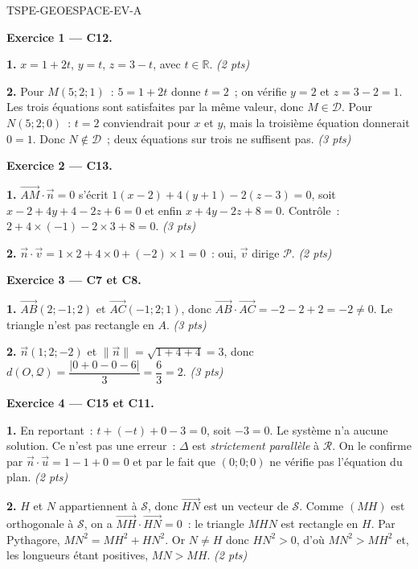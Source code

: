 
\begin{corrige}{TSPE-GEOESPACE-EV-A}

\textbf{Exercice 1 — C12.}

\textbf{1.} $x=1+2t$, $y=t$, $z=3-t$, avec $t\in\mathbb{R}$. \hfill\textit{(2 pts)}

\textbf{2.} Pour $M(5;2;1)$~: $5=1+2t$ donne $t=2$~; on vérifie $y=2$ et
$z=3-2=1$. Les trois équations sont satisfaites par la même valeur, donc
$M\in\mathcal{D}$.
Pour $N(5;2;0)$~: $t=2$ conviendrait pour $x$ et $y$, mais la troisième
équation donnerait $0=1$. Donc $N\notin\mathcal{D}$~; deux équations sur trois
ne suffisent pas. \hfill\textit{(3 pts)}

\medskip
\textbf{Exercice 2 — C13.}

\textbf{1.} $\vec{AM}\cdot\vec{n}=0$ s'écrit $1(x-2)+4(y+1)-2(z-3)=0$, soit
$x-2+4y+4-2z+6=0$ et enfin $x+4y-2z+8=0$. Contrôle~:
$2+4\times(-1)-2\times3+8=0$. \hfill\textit{(3 pts)}

\textbf{2.} $\vec{n}\cdot\vec{v}=1\times2+4\times0+(-2)\times1=0$~: oui,
$\vec{v}$ dirige $\mathcal{P}$. \hfill\textit{(2 pts)}

\medskip
\textbf{Exercice 3 — C7 et C8.}

\textbf{1.} $\vec{AB}(2;-1;2)$ et $\vec{AC}(-1;2;1)$, donc
$\vec{AB}\cdot\vec{AC}=-2-2+2=-2\neq0$. Le triangle n'est pas rectangle en
$A$. \hfill\textit{(3 pts)}

\textbf{2.} $\vec{n}(1;2;-2)$ et $\lVert\vec{n}\rVert=\sqrt{1+4+4}=3$, donc
$d(O,\mathcal{Q})=\dfrac{\lvert 0+0-0-6\rvert}{3}=\dfrac{6}{3}=2$.
\hfill\textit{(3 pts)}

\medskip
\textbf{Exercice 4 — C15 et C11.}

\textbf{1.} En reportant~: $t+(-t)+0-3=0$, soit $-3=0$. Le système n'a aucune
solution. Ce n'est pas une erreur~: $\Delta$ est \emph{strictement parallèle}
à $\mathcal{R}$. On le confirme par $\vec{n}\cdot\vec{u}=1-1+0=0$ et par le
fait que $(0;0;0)$ ne vérifie pas l'équation du plan. \hfill\textit{(2 pts)}

\textbf{2.} $H$ et $N$ appartiennent à $\mathcal{S}$, donc $\vec{HN}$ est un
vecteur de $\mathcal{S}$. Comme $(MH)$ est orthogonale à $\mathcal{S}$, on a
$\vec{MH}\cdot\vec{HN}=0$~: le triangle $MHN$ est rectangle en $H$. Par
Pythagore, $MN^2=MH^2+HN^2$. Or $N\neq H$ donc $HN^2>0$, d'où $MN^2>MH^2$ et,
les longueurs étant positives, $MN>MH$. \hfill\textit{(2 pts)}

\end{corrige}

